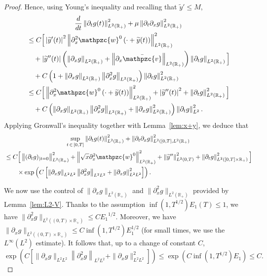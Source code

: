 \documentclass[AHL,Unicode,longabstracts,published]{cedram}
\newcommand{\R}{\mathbb{R}}
\newcommand{\p}{\partial}
\newcommand{\bv}{\bar{\mathpzc{v}}}
\newcommand{\tw}{\mathpzc{w}}
\newcommand{\ty}{\widetilde{y}}
\begin{document}
\begin{proof}
Hence, using Young's inequality and recalling that $\ty'\leq M$,
\begin{multline*}
 \dfrac{d}{dt} \left\|\partial_tg(t)\right\|_{L^2(\R_+)}^2 +\mu \left\|\partial_t \partial_xg\right\|_{L^2(\R_+)}^2 \\
\begin{aligned}
&\leq C \Big[\left|\ty'(t)\right|^2 \left\|\partial^2_x \tw^0\left(\cdot + \ty(t)\right)\right\|_{L^2(\R_+)}^2 \\
&\quad+\left|\ty''(t)\right|\left(\left\|\p_x g\right\|_{L^2(\R_+)} + \left\|\p_x \bv\right\|_{L^2(\R_+)}\right)\left\|\p_t g\right\|_{L^2(\R_+)}\Big]\\
&\quad + C\left(1+ \left\|\partial_xg\right\|_{L^2(\R_+)}\left\|\partial_x^2g\right\|_{L^2(\R_+)}\right) \left\|\partial_t g\right\|_{L^2(\R_+)}^2\\
&\leq C\Big[\left\|\partial^2_x \tw^0\left(\cdot + \ty(t)\right)\right\|_{L^2(\R_+)}^2 +\left|\ty''(t)\right|^2 + \left\|\p_t g\right\|_{L^2(\R_+)}^2\Big]\\
&\quad + C \left(\left\|\partial_xg\right\|_{L^2(\R_+)}\left\|\partial_x^2g\right\|_{L^2(\R_+)} + \left\|\p_x g\right\|_{L^2(\R_+)}^2\right) \left\|\p_t g\right\|_{L^2}^2.
\end{aligned}
\end{multline*}
Applying Gronwall's inequality together with Lemma~\ref{lem:x+y}, we deduce that
\begin{multline*}
 \sup_{t\,\in\,[0,T]} \left\|\partial_tg(t)\right\|_{L^2(\R_+)}^2 + \left\|\partial_t \partial_xg\right\|_{L^2([0,T],L^2(\R_+)}^2 \\
\begin{aligned}
& \leq C\Big[\left\|(\partial_tg)_{|t=0}\right\|_{L^2(\R_+)}^2 + \left\|\sqrt{x} \partial^2_x \tw^0\right\|_{L^2(\R_+)}^2 + \left\|\ty''\right\|_{L^2(0,T)}^2 + \left\|\p_t g\right\|_{L^2\left([0,T]\times \R_+\right)}^2\Big] \\
& \qquad \times \exp\left(C\left[\left\|\partial_xg\right\|_{L^2L^2}\left\|\partial^2_xg\right\|_{L^2L^2} + \left\|\p_x g\right\|_{L^2L^2}^2\right]\right).
\end{aligned}
\end{multline*}



We now use the control of $\|\p_xg\|_{L^2(\R_+)}$ and $\|\p_x^2g\|_{L^2(\R_+)}$ provided by Lemma~\ref{lem:L2-V}. Thanks to the assumption $\inf (1,T^{1/2}) E_1(T)\leq 1$, we have $ \|\p_x^2g\|_{L^2((0,T)\times \R_+)}\leq C { E_1}^{1/2}$. Moreover, we have $\|\p_xg\|_{L^2((0,T)\times \R_+)}\leq C\inf(1, T^{1/2}) E_1^{1/2}$ (for small times, we use the $L^\infty(L^2)$ estimate). It follows that, up to a change of constant $C$,
\[
\exp\left(C\left[\|\partial_xg\|_{L^2L^2}\left\|\partial^2_xg\right\|_{L^2L^2} + \|\p_x g\|_{L^2L^2}^2\right]\right) \leq \exp\left(C\inf\left(1, T^{1/2}\right) E_1\right) \leq C.
\]


\end{proof}
\end{document}
